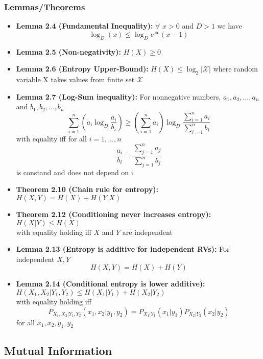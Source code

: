 \documentclass{article}
\begin{document}
\subsubsection{Lemmas/Theorems}
\begin{flushleft}
    \begin{itemize}
        \item \textbf{Lemma 2.4 (Fundamental Inequality):} \(\forall\) \(x>0\) and \(D > 1\) we have \[\log_{D}{(x)} \leq \log_{D}{e}*(x-1) \]

        \item \textbf{Lemma 2.5 (Non-negativity):} \(H(X) \geq 0\)
    
        \item \textbf{Lemma 2.6 (Entropy Upper-Bound):} \(H(X) \leq \log_{2}{|\mathcal{X}|} \) where random variable X takes values from finite set \(\mathcal{X}\)
    
        \item \textbf{Lemma 2.7 (Log-Sum inequality):} For nonnegative numbers, \(a_1, a_2, \ldots, a_n\) and \(b_1, b_2, \ldots, b_n\)
        \[\sum_{i=1}^{n}(a_i \log_D \frac{a_i}{b_i}) \geq (\sum_{i=1}^n a_i) \log_D \frac{\sum_{i=1}^n a_i}{\sum_{i=1}^n b_i}\]  
        with equality iff for all \(i=1, \ldots, n\)
        \[\frac{a_i}{b_i} = \frac{\sum_{j=1}^n a_j}{\sum_{j=1}^n b_j}\]
        is constand and does not depend on i
        \item \textbf{Theorem 2.10 (Chain rule for entropy): } \( H(X,Y) = H(X) + H(Y|X)\)
        \item \textbf{Theorem 2.12 (Conditioning never increases entropy):} \(H(X|Y) \leq H(X)\) \\
        with equality holding iff \(X\) and \(Y\) are independent
        \item \textbf{Lemma 2.13 (Entropy is additive for independent RVs): } For independent \(X, Y\)
        \[H(X,Y) = H(X) + H(Y)\]
        \item \textbf{Lemma 2.14 (Conditional entropy is lower additive): } \(H(X_1, X_2|Y_1, Y_2) \leq H(X_1|Y_1) + H(X_2|Y_2)\)
        \\ with equality holding iff 
        \[P_{X_1, X_2|Y_1, Y_2} (x_1, x_2|y_1, y_2) = P_{X_1|Y_1}(x_1|y_1)P_{X_2|Y_2}(x_2|y_2)\]
        for all \(x_1, x_2, y_1, y_2\)

    \end{itemize}
\end{flushleft}

\subsection{Mutual Information}
\end{document}
